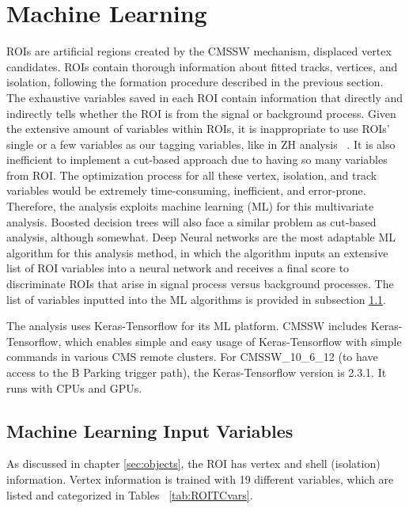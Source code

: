 \clearpage
\chapter{Machine Learning}\label{sec:machinelearning}
ROIs are artificial regions created by the CMSSW mechanism, displaced vertex candidates.
ROIs contain thorough information about fitted tracks, vertices, and isolation, following the formation procedure described in the previous section.
The exhaustive variables saved in each ROI contain information that directly and indirectly tells whether the ROI is from the signal or background process.
Given the extensive amount of variables within ROIs, it is inappropriate to use ROIs' single or a few variables as our tagging variables, like in ZH analysis ~\cite{ZHAN}.
It is also inefficient to implement a cut-based approach due to having so many variables from ROI.
The optimization process for all these vertex, isolation, and track variables would be extremely time-consuming, inefficient, and error-prone.
Therefore, the analysis exploits machine learning (ML) for this multivariate analysis.
Boosted decision trees will also face a similar problem as cut-based analysis, although somewhat.
Deep Neural networks are the most adaptable ML algorithm for this analysis method, in which the algorithm inputs an extensive list of ROI variables into a neural network and receives a final score to discriminate ROIs that arise in signal process versus background processes.
The list of variables inputted into the ML algorithms is provided in subsection \ref{sec:MLIV}.

The analysis uses Keras-Tensorflow for its ML platform.
CMSSW includes Keras-Tensorflow, which enables simple and easy usage of Keras-Tensorflow with simple commands in various CMS remote clusters.
For CMSSW\_10\_6\_12 (to have access to the B Parking trigger path), the Keras-Tensorflow version is 2.3.1.
It runs with CPUs and GPUs.
\section{Machine Learning Input Variables}\label{sec:MLIV}
As discussed in chapter \ref{sec:objects}, the ROI has vertex and shell (isolation) information.
Vertex information is trained with 19 different variables, which are listed and categorized in Tables ~\ref{tab:ROITCvars}.

